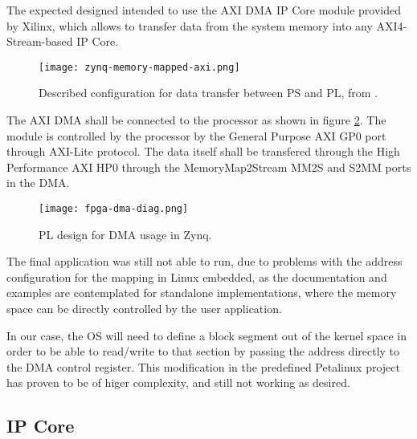 The expected designed intended to use the AXI DMA IP Core module provided by Xilinx, which allows to
transfer data from the system memory into any AXI4-Stream-based IP Core.

\begin{figure}[htp]
	\centering
	\texttt{[image: zynq-memory-mapped-axi.png]}
	\caption{Described configuration for data transfer between PS and PL, from \cite{UG1046}.}
	\label{fig:zynq-memory-mapped-axi}
\end{figure}

The AXI DMA shall be connected to the processor as shown in figure \ref{fig:fpga-dma-diag}. The
module is controlled by the processor by the General Purpose AXI GP0 port through AXI-Lite protocol.
The data itself shall be transfered through the High Performance AXI HP0 through the
MemoryMap2Stream MM2S and S2MM ports in the DMA.

\begin{figure}[htp]
	\centering
	\texttt{[image: fpga-dma-diag.png]}
	\caption{PL design for DMA usage in Zynq.}
	\label{fig:fpga-dma-diag}
\end{figure}

The final application was still not able to run, due to problems with the address configuration for
the mapping in Linux embedded, as the documentation and examples are contemplated for standalone
implementations, where the memory space can be directly controlled by the user application.

In our case, the OS will need to define a block segment out of the kernel space in order to be able
to read/write to that section by passing the address directly to the DMA control register. This
modification in the predefined Petalinux project has proven to be of higer complexity, and still not
working as desired.


\subsection{IP Core}



